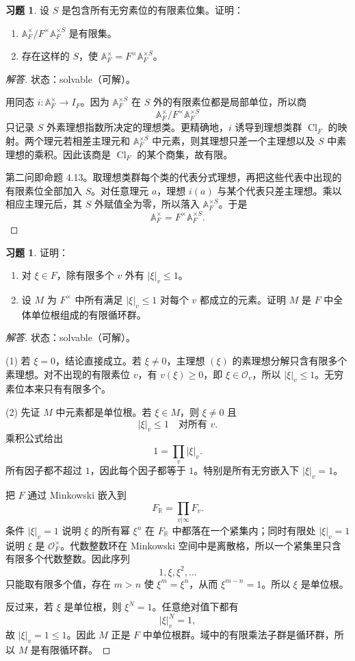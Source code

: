 \documentclass[11pt,a4paper,openany]{ctexbook}
\numberwithin{equation}{chapter}
\newcommand{\R}{\mathbb{R}}
\newcommand{\A}{\mathbb{A}}
\newcommand{\Cl}{\operatorname{Cl}}
\theoremstyle{plain}
\theoremstyle{definition}
\newtheorem{exercise}[theorem]{习题}
\theoremstyle{remark}
\begin{document}
\begin{exercise}
设 $S$ 是包含所有无穷素位的有限素位集。证明：
\begin{enumerate}[label=(\arabic*)]
\item $\A_F^\times/F^\times\A_F^{\times S}$ 是有限集。
\item 存在这样的 $S$，使 $\A_F^\times=F^\times\A_F^{\times S}$。
\end{enumerate}
\end{exercise}

\begin{proof}[解答]
状态：solvable（可解）。

用同态 $i:\A_F^\times\to I_F$。因为 $\A_F^{\times S}$ 在 $S$ 外的有限素位都是局部单位，所以商
\[
 \A_F^\times/F^\times\A_F^{\times S}
\]
只记录 $S$ 外素理想指数所决定的理想类。更精确地，$i$ 诱导到理想类群 $\Cl_F$ 的映射。两个理元若相差主理元和 $\A_F^{\times S}$ 中元素，则其理想只差一个主理想以及 $S$ 中素理想的乘积。因此该商是 $\Cl_F$ 的某个商集，故有限。

第二问即命题 4.13。取理想类群每个类的代表分式理想，再把这些代表中出现的有限素位全部加入 $S$。对任意理元 $a$，理想 $i(a)$ 与某个代表只差主理想。乘以相应主理元后，其 $S$ 外赋值全为零，所以落入 $\A_F^{\times S}$。于是
\[
 \A_F^\times=F^\times\A_F^{\times S}.
\]
\end{proof}

\begin{exercise}
证明：
\begin{enumerate}[label=(\arabic*)]
\item 对 $\xi\in F$，除有限多个 $v$ 外有 $|\xi|_v\le1$。
\item 设 $M$ 为 $F^\times$ 中所有满足 $|\xi|_v\le1$ 对每个 $v$ 都成立的元素。证明 $M$ 是 $F$ 中全体单位根组成的有限循环群。
\end{enumerate}
\end{exercise}

\begin{proof}[解答]
状态：solvable（可解）。

(1) 若 $\xi=0$，结论直接成立。若 $\xi\ne0$，主理想 $(\xi)$ 的素理想分解只含有限多个素理想。对不出现的有限素位 $v$，有 $v(\xi)\ge0$，即 $\xi\in\mathcal O_v$，所以 $|\xi|_v\le1$。无穷素位本来只有有限多个。

(2) 先证 $M$ 中元素都是单位根。若 $\xi\in M$，则 $\xi\ne0$ 且
\[
 |\xi|_v\le1\quad\text{对所有 }v.
\]
乘积公式给出
\[
 1=\prod_v|\xi|_v.
\]
所有因子都不超过 $1$，因此每个因子都等于 $1$。特别是所有无穷嵌入下 $|\xi|_v=1$。

把 $F$ 通过 Minkowski 嵌入到
\[
 F_\R=\prod_{v|\infty}F_v.
\]
条件 $|\xi|_v=1$ 说明 $\xi$ 的所有幂 $\xi^n$ 在 $F_\R$ 中都落在一个紧集内；同时有限处 $|\xi|_v=1$ 说明 $\xi$ 是 $\mathcal O_F^\times$。代数整数环在 Minkowski 空间中是离散格，所以一个紧集里只含有限多个代数整数。因此序列
\[
 1,\xi,\xi^2,\ldots
\]
只能取有限多个值，存在 $m>n$ 使 $\xi^m=\xi^n$，从而 $\xi^{m-n}=1$。所以 $\xi$ 是单位根。

反过来，若 $\xi$ 是单位根，则 $\xi^N=1$。任意绝对值下都有
\[
 |\xi|_v^N=1,
\]
故 $|\xi|_v=1\le1$。因此 $M$ 正是 $F$ 中单位根群。域中的有限乘法子群是循环群，所以 $M$ 是有限循环群。
\end{proof}
\end{document}
